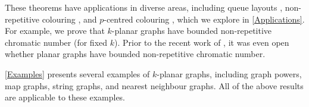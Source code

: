 \documentclass{patmorin}
\renewcommand{\geq}{\geqslant}
\begin{document}

These theorems have applications in diverse areas, including queue layouts  \citep{dujmovic.joret.ea:planar}, non-repetitive colouring  \citep{dujmovic.esperet.ea:planar}, and $p$-centred colouring  \citep{micek:personal}, 
which we explore in \cref{Applications}. For example, we prove that $k$-planar graphs have bounded non-repetitive chromatic number (for fixed $k$). Prior to the recent work of \citet{dujmovic.esperet.ea:planar}, it was even open whether planar graphs have bounded non-repetitive chromatic number.


\cref{Examples} presents several examples of $k$-planar graphs, including graph powers, map graphs, string graphs, and nearest neighbour graphs. All of the above results are applicable to these examples. 


%
\end{document}
